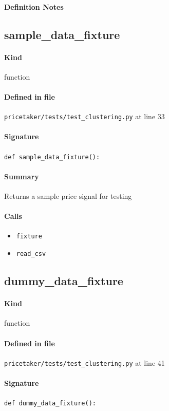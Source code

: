 \documentclass[11pt]{report}
\begin{document}
\paragraph{Definition Notes}
\subsection{sample\_data\_fixture}
\label{def:pricetaker-tests-test_clustering.py:sample_data_fixture:L33}
\paragraph{Kind} function
\paragraph{Defined in file} \texttt{pricetaker/tests/test\_clustering.py} at line 33
\paragraph{Signature} \texttt{def sample\_data\_fixture():}
\paragraph{Summary} Returns a sample price signal for testing
\paragraph{Calls}
\begin{itemize}[leftmargin=*]
  \item \texttt{fixture}
  \item \texttt{read\_csv}
\end{itemize}
\subsection{dummy\_data\_fixture}
\label{def:pricetaker-tests-test_clustering.py:dummy_data_fixture:L41}
\paragraph{Kind} function
\paragraph{Defined in file} \texttt{pricetaker/tests/test\_clustering.py} at line 41
\paragraph{Signature} \texttt{def dummy\_data\_fixture():}
\end{document}
